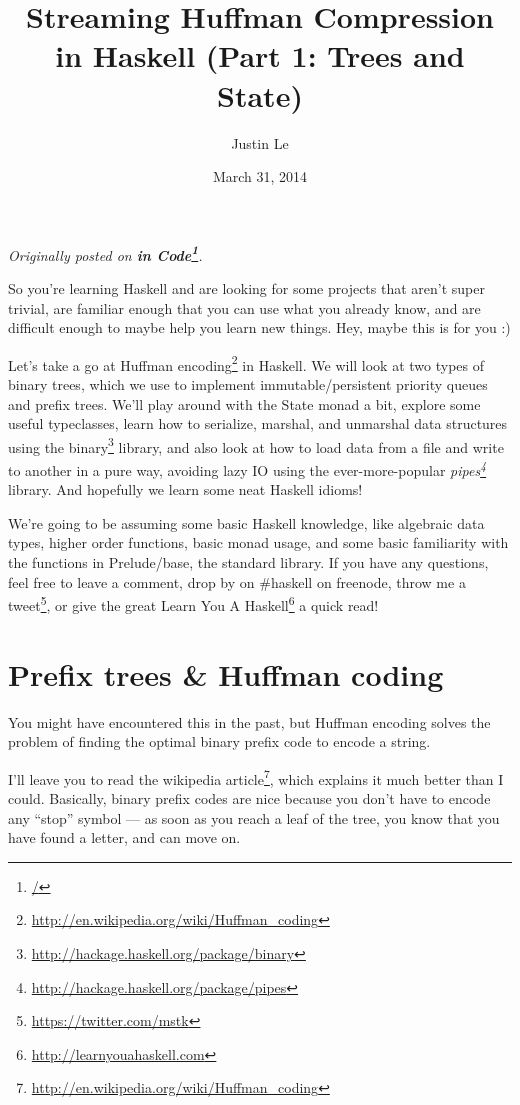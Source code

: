 \documentclass[]{article}
\title{Streaming Huffman Compression in Haskell (Part 1: Trees and State)}
\author{Justin Le}
\date{March 31, 2014}
\renewcommand{\href}[2]{#2\footnote{\url{#1}}}
\begin{document}
\maketitle

\emph{Originally posted on \textbf{\href{/}{in Code}}.}

So you're learning Haskell and are looking for some projects that aren't
super trivial, are familiar enough that you can use what you already
know, and are difficult enough to maybe help you learn new things. Hey,
maybe this is for you :)

Let's take a go at
\href{http://en.wikipedia.org/wiki/Huffman_coding}{Huffman encoding} in
Haskell. We will look at two types of binary trees, which we use to
implement immutable/persistent priority queues and prefix trees. We'll
play around with the State monad a bit, explore some useful typeclasses,
learn how to serialize, marshal, and unmarshal data structures using the
\href{http://hackage.haskell.org/package/binary}{binary} library, and
also look at how to load data from a file and write to another in a pure
way, avoiding lazy IO using the ever-more-popular
\emph{\href{http://hackage.haskell.org/package/pipes}{pipes}} library.
And hopefully we learn some neat Haskell idioms!

We're going to be assuming some basic Haskell knowledge, like algebraic
data types, higher order functions, basic monad usage, and some basic
familiarity with the functions in Prelude/base, the standard library. If
you have any questions, feel free to leave a comment, drop by on
\#haskell on freenode, throw me a
\href{https://twitter.com/mstk}{tweet}, or give the great
\href{http://learnyouahaskell.com}{Learn You A Haskell} a quick read!

\section{Prefix trees \& Huffman
coding}\label{prefix-trees-huffman-coding}

You might have encountered this in the past, but Huffman encoding solves
the problem of finding the optimal binary prefix code to encode a
string.

I'll leave you to read
\href{http://en.wikipedia.org/wiki/Huffman_coding}{the wikipedia
article}, which explains it much better than I could. Basically, binary
prefix codes are nice because you don't have to encode any ``stop''
symbol --- as soon as you reach a leaf of the tree, you know that you
have found a letter, and can move on.
\end{document}
